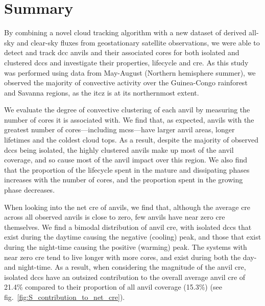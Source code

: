 \section{Summary}  %

By combining a novel cloud tracking algorithm with a new dataset of derived all-sky and clear-sky fluxes from geostationary satellite observations, we were able to detect and track \acrshort{dcc} anvils and their associated cores for both isolated and clustered \acrshort{dcc}s and investigate their properties, lifecycle and \acrshort{cre}. 
As this study was performed using data from May-August (Northern hemisphere summer), we observed the majority of convective activity over the Guinea-Congo rainforest and Savanna regions, as the \acrshort{itcz} is at its northernmost extent.

We evaluate the degree of convective clustering of each anvil by measuring the number of cores it is associated with. 
We find that, as expected, anvils with the greatest number of cores---including \acrshort{mcs}s---have larger anvil areas, longer lifetimes and the coldest cloud tops. 
As a result, despite the majority of observed \acrshort{dcc}s being isolated, the highly clustered anvils make up most of the anvil coverage, and so cause most of the anvil impact over this region. 
We also find that the proportion of the lifecycle spent in the mature and dissipating phases increases with the number of cores, and the proportion spent in the growing phase decreases.

When looking into the net \acrshort{cre} of anvils, we find that, although the average \acrshort{cre} across all observed anvils is close to zero, few anvils have near zero \acrshort{cre} themselves. 
We find a bimodal distribution of anvil \acrshort{cre}, with isolated \acrshort{dcc}s that exist during the daytime causing the negative (cooling) peak, and those that exist during the night-time causing the positive (warming) peak. 
The systems with near zero \acrshort{cre} tend to live longer with more cores, and exist during both the day- and night-time. 
As a result, when considering the magnitude of the anvil \acrshort{cre}, isolated \acrshort{dcc}s have an outsized contribution to the overall average anvil \acrshort{cre} of 21.4\% compared to their proportion of all anvil coverage (15.3\%) (see fig.~\ref{fig:S_contribution_to_net_cre}).

